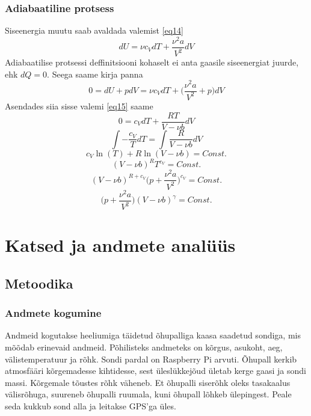 \documentclass{trkut}%
\begin{document}
\subsection{Adiabaatiline protsess}
Siseenergia muutu saab avaldada valemist \ref{eq14}
\begin{equation}
dU = \nu c_VdT + \frac{\nu^2 a}{V^2}dV
\end{equation}
Adiabaatilise protsessi deffinitsiooni kohaselt ei anta gaasile siseenergiat juurde, ehk $dQ = 0$. Seega saame kirja panna
\begin{equation}
0 = dU + pdV = \nu c_V dT + \bigg( \frac{\nu^2 a}{V^2} + p \bigg) dV
\end{equation}
Asendades siia sisse valemi \ref{eq15} saame
\begin{equation}
0 = c_V dT + \frac{RT}{V - \nu b}dV
\end{equation}
\begin{equation}
\int - \frac{c_V}{T} dT = \int \frac{R}{V - \nu b}dV
\end{equation}
\begin{equation}
c_V \ln(T) + R \ln(V - \nu b) = Const.
\end{equation}
\begin{equation}
(V - \nu b)^R T^{c_V} = Const.
\end{equation}
\begin{equation}
(V - \nu b)^{R + c_V} \bigg( p + \frac{\nu^2 a}{V^2} \bigg)^{c_V} = Const.
\end{equation}
\begin{equation}
 \bigg( p + \frac{\nu^2 a}{V^2} \bigg) (V - \nu b)^\gamma = Const.
\end{equation}


\chapter{Katsed ja andmete analüüs}
\section{Metoodika}
\subsection{Andmete kogumine}
Andmeid kogutakse heeliumiga täidetud õhupalliga kaasa saadetud sondiga, mis mõõdab erinevaid andmeid. Põhilisteks andmeteks on kõrgus, asukoht, aeg, välistemperatuur ja rõhk. Sondi pardal on Raspberry Pi arvuti. Õhupall kerkib atmosfääri kõrgemadesse kihtidesse, sest üleslükkejõud ületab kerge gaasi ja sondi massi. Kõrgemale tõustes rõhk väheneb. Et õhupalli siserõhk oleks tasakaalus välisrõhuga, suureneb õhupalli ruumala, kuni õhupall lõhkeb ülepingest. Peale seda kukkub sond alla ja leitakse GPS'ga üles.
\end{document}
